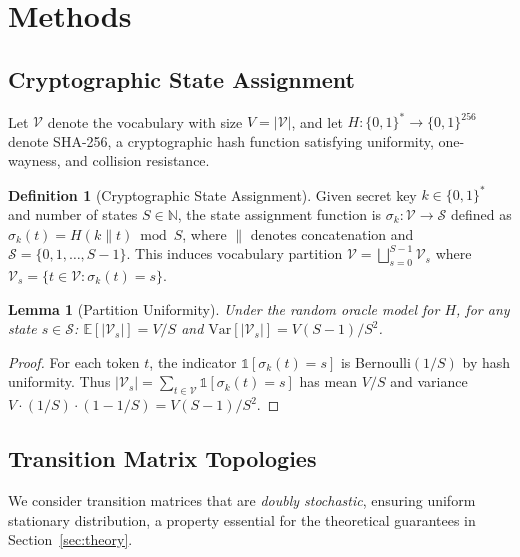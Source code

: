 \documentclass[11pt]{article}
\newtheorem{lemma}[theorem]{Lemma}
\theoremstyle{definition}
\newtheorem{definition}[theorem]{Definition}
\theoremstyle{remark}
\begin{document}
\section{Methods}

\subsection{Cryptographic State Assignment}

Let $\mathcal{V}$ denote the vocabulary with size $V = |\mathcal{V}|$, and let $H: \{0,1\}^* \to \{0,1\}^{256}$ denote SHA-256, a cryptographic hash function satisfying uniformity, one-wayness, and collision resistance.

\begin{definition}[Cryptographic State Assignment]
\label{def:state}
Given secret key $k \in \{0,1\}^*$ and number of states $S \in \mathbb{N}$, the state assignment function is $\sigma_k: \mathcal{V} \to \mathcal{S}$ defined as $\sigma_k(t) = H(k \| t) \bmod S$, where $\|$ denotes concatenation and $\mathcal{S} = \{0, 1, \ldots, S-1\}$. This induces vocabulary partition $\mathcal{V} = \bigsqcup_{s=0}^{S-1} \mathcal{V}_s$ where $\mathcal{V}_s = \{t \in \mathcal{V} : \sigma_k(t) = s\}$.
\end{definition}

\begin{lemma}[Partition Uniformity]
\label{lem:uniform}
Under the random oracle model for $H$, for any state $s \in \mathcal{S}$: $\mathbb{E}[|\mathcal{V}_s|] = V/S$ and $\text{Var}[|\mathcal{V}_s|] = V(S-1)/S^2$.
\end{lemma}

\begin{proof}
For each token $t$, the indicator $\mathbb{1}[\sigma_k(t) = s]$ is Bernoulli$(1/S)$ by hash uniformity. Thus $|\mathcal{V}_s| = \sum_{t \in \mathcal{V}} \mathbb{1}[\sigma_k(t) = s]$ has mean $V/S$ and variance $V \cdot (1/S) \cdot (1-1/S) = V(S-1)/S^2$.
\end{proof}

\subsection{Transition Matrix Topologies}

We consider transition matrices that are \textit{doubly stochastic}, ensuring uniform stationary distribution, a property essential for the theoretical guarantees in Section~\ref{sec:theory}.
\end{document}
